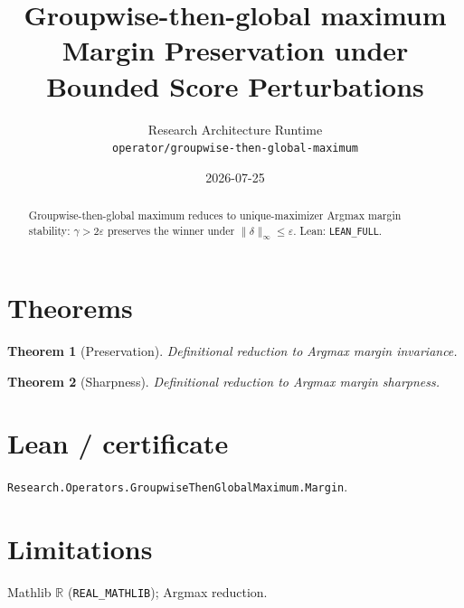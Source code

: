 \documentclass[11pt]{article}
\title{Groupwise-then-global maximum Margin Preservation under Bounded Score Perturbations}
\author{Research Architecture Runtime \\ \texttt{operator/groupwise-then-global-maximum}}
\date{2026-07-25}
\newtheorem{theorem}{Theorem}
\begin{document}
\maketitle
\begin{abstract}
Groupwise-then-global maximum reduces to unique-maximizer Argmax margin stability: $\gamma>2\varepsilon$
preserves the winner under $\|\delta\|_\infty\le\varepsilon$. Lean: \texttt{LEAN\_FULL}.
\end{abstract}
\section{Theorems}
\begin{theorem}[Preservation]
Definitional reduction to Argmax margin invariance.
\end{theorem}
\begin{theorem}[Sharpness]
Definitional reduction to Argmax margin sharpness.
\end{theorem}
\section{Lean / certificate}
\texttt{Research.Operators.GroupwiseThenGlobalMaximum.Margin}.
\section{Limitations}
Mathlib $\mathbb{R}$ (\texttt{REAL\_MATHLIB}); Argmax reduction.
\end{document}
